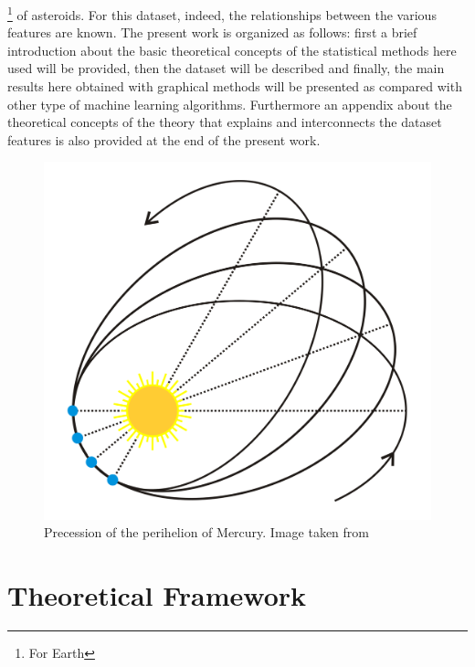 \documentclass[12pt,%
               a4paper,%
               oneside,openany,%
               titlepage,%
               headinclude,footinclude,%
               BCOR5mm,%
               cleardoublepage=empty,%
               tablecaptionabove,%
               floatperchapter,
               ]{scrreprt}                 %
\begin{document}
\footnote{For Earth} of asteroids. For this dataset, indeed, the relationships between the various features are known. The present work is organized as follows: first a brief introduction about the basic theoretical concepts of the statistical methods here used will be provided, then the dataset will be described and finally, the main results here obtained with graphical methods will be presented as compared with other type of machine learning algorithms. Furthermore an appendix about the theoretical concepts of the theory that explains and interconnects the dataset features is also provided at the end of the present work. 


\begin{figure}[h]
\begin{center}
\includegraphics[width=1\textwidth]{Figures/Perihelion_precession2.png}
\caption{Precession of the perihelion of Mercury. Image taken from \cite{Perihelion_precession}}
\label{Perihelion_precession2}
\end{center}
\end{figure}

 


\chapter{Theoretical Framework}
\end{document}
